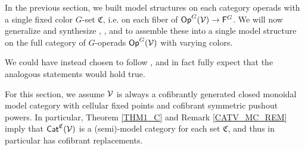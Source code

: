 \documentclass[a4paper,10pt
,draft
]{article}%
\renewcommand{\F}{\mathcal F}
\renewcommand{\1}{\eta}%
\begin{document}
In the previous section, we built model structures on each category operads with a single fixed color $G$-set $\mathfrak C$,
i.e. on each fiber of $\mathsf{Op}^G(\mathcal V) \to \mathsf{F}^G$. 
We will now generalize and synthesize \cite{BM13}, \cite{Cav}, and \cite{CM13b} to assemble these
into a single model structure on the full category of $G$-operads $\mathsf{Op}^G(\mathcal V)$ with varying colors.




\begin{remark}
      We could have instead chosen to follow \cite{Mur15}, and in fact
      fully expect that the analogous statements would hold true.
\end{remark}

\begin{convention}
      For this section, we assume $\mathcal V$ is always a cofibrantly generated closed monoidal model category with cellular fixed points
      and cofibrant symmetric pushout powers.
      In particular, Theorem \ref{THM1_C} and Remark \ref{CATV_MC_REM} imply that $\mathsf{Cat}^{\mathfrak C}(\mathcal V)$ is a (semi)-model category for each set $\mathfrak C$,
      and thus in particular has cofibrant replacements.
\end{convention}


\end{document}
